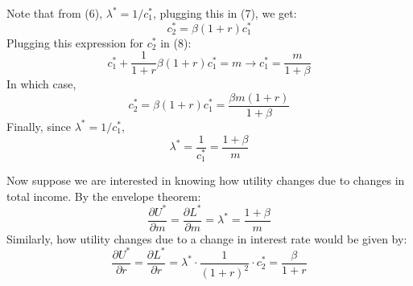 \documentclass{./../../latex/handout}
\begin{document}
Note that from (6), $\lambda^*=1/c_1^*$, plugging this in (7), we get:
\[ c_2^* = \beta(1+r)c_1^*  \]
Plugging this expression for $ c_2^*$ in (8):
\[ c_1^* + \frac{1}{1+r}\beta(1+r)c_1^* = m \rightarrow c_1^* =\frac{m}{1+\beta}  \]
In which case,
\[ c_2^* = \beta(1+r)c_1^* = \frac{\beta m(1+r)}{1+\beta}    \]
Finally, since $\lambda^*=1/c_1^*$,
\[\lambda^*=\frac{1}{c_1^*} = \frac{1+\beta}{m} \]

Now suppose we are interested in knowing how utility changes due to changes in total income. By the envelope theorem:
\[ \frac{\partial U^*}{\partial m}=\frac{\partial L^*}{\partial m} = \lambda^* = \frac{1+\beta}{m} \]
Similarly, how utility changes due to a change in interest rate would be given by:
\[ \frac{\partial U^*}{\partial r}=\frac{\partial L^*}{\partial r} = \lambda^*\cdot \frac{1}{(1+r)^2}\cdot c_2^* = \frac{\beta}{1+r} \]
\end{document}
